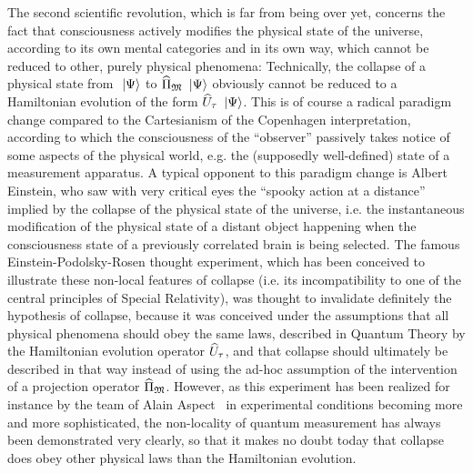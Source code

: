 \documentclass[10pt,a4paper,twoside,openany]{book}
\begin{document}
The second scientific revolution, which is far from being over yet, concerns the fact that consciousness actively modifies the physical state of the universe, according to its own mental categories and in its own way, which cannot be reduced to other, purely physical phenomena: Technically, the collapse of a physical state from $\ \left|{\Psi}\right\rangle$ to $\widehat{\Pi}_{\mathfrak{M}} \ \left|{\Psi}\right\rangle$ obviously cannot be reduced to a Hamiltonian evolution of the form $\widehat{U}_\tau \ \left|{\Psi}\right\rangle$. This is of course a radical paradigm change compared to the Cartesianism of the Copenhagen interpretation, according to which the consciousness of the ``observer'' passively takes notice of some aspects of the physical world, e.g. the (supposedly well-defined) state of a measurement apparatus. A typical opponent to this paradigm change is Albert Einstein, who saw with very critical eyes the ``spooky action at a distance'' implied by the collapse of the physical state of the universe, i.e. the instantaneous modification of the physical state of a distant object happening when the consciousness state of a previously correlated brain is being selected. The famous Einstein-Podolsky-Rosen thought experiment, which has been conceived to illustrate these non-local features of collapse (i.e. its incompatibility to one of the central principles of Special Relativity), was thought to invalidate definitely the hypothesis of collapse, because it was conceived under the assumptions that all physical phenomena should obey the same laws, described in Quantum Theory by the Hamiltonian evolution operator $\widehat{U}_\tau$, and that collapse should ultimately be described in that way instead of using the ad-hoc assumption of the intervention of a projection operator $\widehat{\Pi}_{\mathfrak{M}}$. However, as this experiment has been realized for instance by the team of Alain Aspect~\cite{Aspect1982} in experimental conditions becoming more and more sophisticated, the non-locality of quantum measurement has always been demonstrated very clearly, so that it makes no doubt today that collapse does obey other physical laws than the Hamiltonian evolution.
\end{document}
